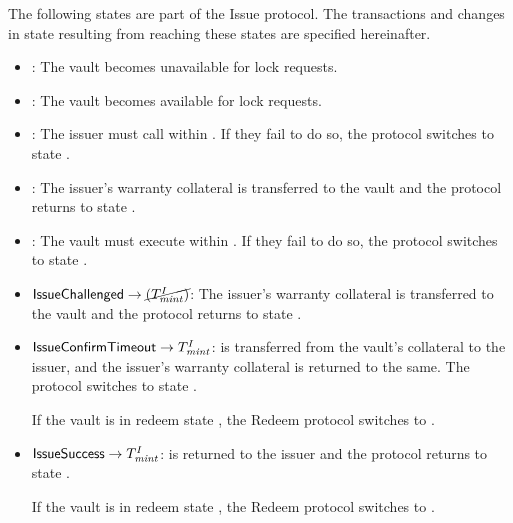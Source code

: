 The following states are part of the Issue protocol.
The transactions and changes in state resulting from reaching these states are specified hereinafter.
\begin{itemize}
    \item \stateni:
    The vault becomes unavailable for lock requests.
    
    \item \statevai:
    The vault becomes available for lock requests.
    
    \item \stateam:
    The issuer must call \mintop within \dm.
    If they fail to do so, the protocol switches to state \statemt.
    
    \item \statemt:
    The issuer's warranty collateral is transferred to the vault and the protocol returns to state \statevai.
    
    \item
    \begin{sloppypar}
    \stateaic:
    The vault must execute \confirmIssueop within \dci.
    If they fail to do so, the protocol switches to state \stateict.
    \end{sloppypar}
    
    \item $\mathsf{IssueChallenged} \rightarrow \cancel{(T^I_{\mathit{mint}})}$:
    The issuer's warranty collateral is transferred to the vault and the protocol returns to state \statevai.
    
    \item $\mathsf{IssueConfirmTimeout} \rightarrow T^I_{\mathit{mint}}$:
    \iw is transferred from the vault's collateral to the issuer, and the issuer's warranty collateral is returned to the same.
    The protocol switches to state \stateni.
    
    If the vault is in redeem state \statenr, the Redeem protocol switches to \statevar.
    
    \item $\mathsf{IssueSuccess} \rightarrow T^I_{\mathit{mint}}$:
    \iw is returned to the issuer and the protocol returns to state \statevai.
    
    If the vault is in redeem state \statenr, the Redeem protocol switches to \statevar.
\end{itemize}

